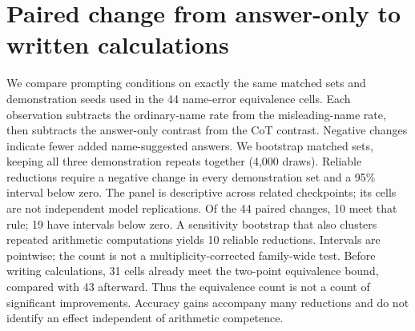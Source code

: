 \section{Paired change from answer-only to written calculations}
\label{app:round7-paired}
We compare prompting conditions on exactly the same matched sets and demonstration seeds used in the 44 name-error equivalence cells. Each observation subtracts the ordinary-name rate from the misleading-name rate, then subtracts the answer-only contrast from the CoT contrast. Negative changes indicate fewer added name-suggested answers. We bootstrap matched sets, keeping all three demonstration repeats together (4,000 draws). Reliable reductions require a negative change in every demonstration set and a 95\% interval below zero. The panel is descriptive across related checkpoints; its cells are not independent model replications.
Of the 44 paired changes, 10 meet that rule; 19 have intervals below zero. A sensitivity bootstrap that also clusters repeated arithmetic computations yields 10 reliable reductions. Intervals are pointwise; the count is not a multiplicity-corrected family-wide test. Before writing calculations, 31 cells already meet the two-point equivalence bound, compared with 43 afterward. Thus the equivalence count is not a count of significant improvements. Accuracy gains accompany many reductions and do not identify an effect independent of arithmetic competence.
\newsavebox{\roundsevenbox}

